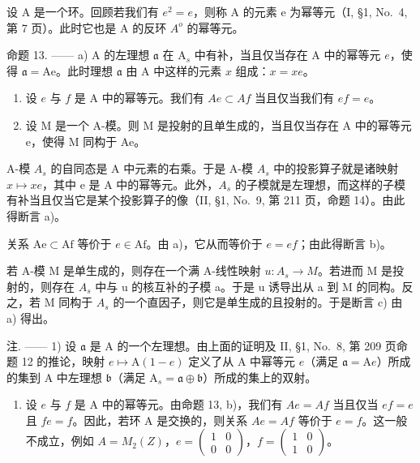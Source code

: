 设 A 是一个环。回顾若我们有 \(e^{2} = e\)，则称 A 的元素 e 为幂等元（I, §1, No.~4, 第 7 页）。此时它也是 A 的反环 \(A^{o}\) 的幂等元。

命题 13. —— a) A 的左理想 \(\mathfrak{a}\) 在 \(\mathrm{A}_s\) 中有补，当且仅当存在 A 中的幂等元 \(e\)，使得 \(\mathfrak{a} = \mathrm{Ae}\)。此时理想 \(\mathfrak{a}\) 由 A 中这样的元素 \(x\) 组成：\(x = xe\)。

\begin{enumerate}
\def\labelenumi{\alph{enumi})}
\setcounter{enumi}{1}
\item
  设 \(e\) 与 \(f\) 是 A 中的幂等元。我们有 \(Ae \subset Af\) 当且仅当我们有 \(ef = e\)。
\item
  设 M 是一个 A-模。则 M 是投射的且单生成的，当且仅当存在 A 中的幂等元 e，使得 M 同构于 Ae。
\end{enumerate}

A-模 \(A_{s}\) 的自同态是 A 中元素的右乘。于是 A-模 \(A_{s}\) 中的投影算子就是诸映射 \(x \mapsto xe\)，其中 e 是 A 中的幂等元。此外，\(A_{s}\) 的子模就是左理想，而这样的子模有补当且仅当它是某个投影算子的像（II, §1, No.~9, 第 211 页，命题 14）。由此得断言 a)。

关系 \(\mathrm{Ae} \subset \mathrm{Af}\) 等价于 \(e \in \mathrm{Af}\)。由 a)，它从而等价于 \(e = ef\)；由此得断言 b)。

若 A-模 M 是单生成的，则存在一个满 A-线性映射 \(u: A_{s} \to M\)。若进而 M 是投射的，则存在 \(A_{s}\) 中与 u 的核互补的子模 a。于是 u 诱导出从 a 到 M 的同构。反之，若 M 同构于 \(A_{s}\) 的一个直因子，则它是单生成的且投射的。于是断言 c) 由 a) 得出。

注. —— 1) 设 \(\mathfrak{a}\) 是 A 的一个左理想。由上面的证明及 II, §1, No.~8, 第 209 页命题 12 的推论，映射 \(e \mapsto \mathrm{A}(1 - e)\) 定义了从 A 中幂等元 \(e\)（满足 \(\mathfrak{a} = \mathrm{A}e\)）所成的集到 A 中左理想 \(\mathfrak{b}\)（满足 \(\mathrm{A}_s = \mathfrak{a} \oplus \mathfrak{b}\)）所成的集上的双射。

\begin{enumerate}
\def\labelenumi{\arabic{enumi})}
\setcounter{enumi}{1}
\tightlist
\item
  设 \(e\) 与 \(f\) 是 A 中的幂等元。由命题 13, b)，我们有 \(Ae = Af\) 当且仅当 \(ef = e\) 且 \(fe = f\)。因此，若环 A 是交换的，则关系 \(Ae = Af\) 等价于 \(e = f\)。这一般不成立，例如 \(A = M_2(Z)\)，\(e = \begin{pmatrix} 1 & 0 \\ 0 & 0 \end{pmatrix}\)，\(f = \begin{pmatrix} 1 & 0 \\ 1 & 0 \end{pmatrix}\)。
\end{enumerate}

